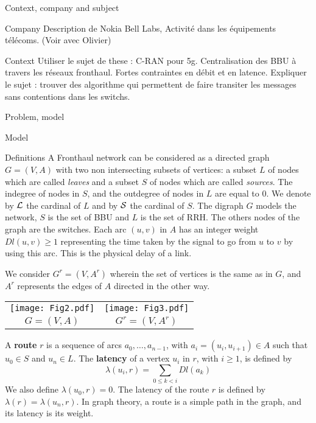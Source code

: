 \documentclass[a4paper,10pt]{report}
\begin{document}
\begin{chapter}{Context, company and subject}
\begin{section}{Company}
 Description de Nokia Bell Labs, Activité dans les équipements télécoms. (Voir avec Olivier)
\end{section}
\begin{section}{Context}
 Utiliser le sujet de these : C-RAN pour 5g. Centralisation des BBU à travers les réseaux fronthaul.
 Fortes contraintes en débit et en latence. Expliquer le sujet : trouver des algorithme qui permettent de faire 
 transiter les messages sans contentions dans les switchs.
\end{section}

\end{chapter}

\begin{chapter}{Problem, model}
 \begin{section}{Model}
 \begin{subsection}{Definitions}
  A Fronthaul network can be considered as a directed graph $G=(V,A)$ with two non intersecting subsets of vertices: 
  a subset $L$ of nodes which are called  \emph{leaves} and a subset $S$ of nodes which are called \emph{sources}.  
The indegree of nodes in $S$, and the outdegree of nodes in $L$ are equal to 0. 
We denote by ${\cal L}$ the cardinal of $L$ and by ${\cal S}$ the cardinal of $S$. The digraph $G$ models the network,
$S$ is the set of BBU and $L$ is the set of RRH. The others nodes of the graph are the switches.
Each arc  $(u,v)$ in $A$ has an integer weight $Dl(u,v) \geq 1$ representing the time taken by the signal to go from $u$ to $v$
by using this arc. This is the physical delay of a link.

We consider $G^r=(V,A^r)$ wherein the set of vertices is the same as in $G$, and $A^r$ represents the edges of $A$ directed in the other way. 
\newline
\begin{tabular}{cc}
\texttt{[image: Fig2.pdf]} & \texttt{[image: Fig3.pdf]}\\
 $G=(V,A)$ & $G^r=(V,A^r)$\\
\end{tabular}\newline

A {\bf route} $r$ is a sequence of arcs $a_0, \ldots , a_{n-1}$, with $a_i=(u_i,u_{i+1}) \in A$ such that $u_0 \in S$ and $u_n \in L$.
The {\bf latency} of a vertex $u_i$ in $r$, with $i \geq 1$, is defined by $$\lambda(u_i,r)= \sum\limits_{0 \leq k <i} Dl(a_k)$$ We also define $\lambda(u_0,r)=0$.
The latency of the route $r$ is defined by $\lambda (r)= \lambda (u_n,r)$. In graph theory, a route is a simple path in the graph, and its latency is its weight. 



\end{subsection}
\end{section}
\end{chapter}
\end{document}
